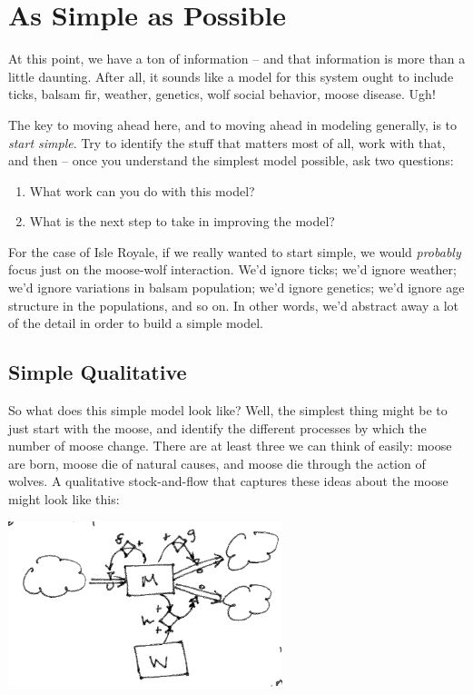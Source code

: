 \documentclass{tufte-handout}
\begin{document}
\section{As Simple as Possible}

At this point, we have a ton of information -- and that information is more than a little daunting.  After all, it sounds like a model for this system ought to include ticks, balsam fir, weather, genetics, wolf social behavior, moose disease.  Ugh!

The key to moving ahead here, and to moving ahead in modeling generally, is to {\em start simple}.  Try to identify the stuff that matters most of all, work with that, and then -- once you understand the simplest model possible, ask two questions:
\begin{enumerate}
\item What work can you do with this model?
\item What is the next step to take in improving the model?
\end{enumerate}

For the case of Isle Royale, if we really wanted to start simple, we would {\it probably} focus just on the moose-wolf interaction.  We'd ignore ticks; we'd ignore weather; we'd ignore variations in balsam population; we'd ignore genetics; we'd ignore age structure in the populations, and so on.  In other words, we'd abstract away a lot of the detail in order to build a simple model.

\subsection{Simple Qualitative}
So what does this simple model look like?  Well, the simplest thing might be to just start with the moose, and identify the different processes by which the number of moose change.  There are at least three we can think of easily:  moose are born, moose die of natural causes, and moose die through the action of wolves.  A qualitative stock-and-flow that captures these ideas about the moose might look like this:

\includegraphics[width=8cm]{figs/QualitativeMooseStockAndFlow}
\end{document}
